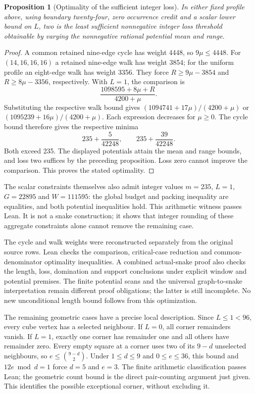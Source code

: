 \documentclass[11pt,a4paper]{article}
\newtheorem{proposition}[theorem]{Proposition}
\theoremstyle{definition}
\theoremstyle{remark}
\begin{document}
\begin{proposition}[Optimality of the sufficient integer loss]
In either fixed profile above, using boundary twenty-four, zero
occurrence credit and a scalar lower bound on $L$, two is the least
sufficient nonnegative integer loss threshold obtainable by varying
the nonnegative rational potential mean and range.
\end{proposition}
\begin{proof}
A common retained nine-edge cycle has weight 4448, so $9\mu\le4448$.
For $(14,16,16,16)$ a retained nine-edge walk has weight 3854;
for the uniform profile an eight-edge walk has weight 3356.
They force $R\ge9\mu-3854$ and $R\ge8\mu-3356$, respectively.
With $L=1$, the comparison is
\[
\frac{1098595+8\mu+R}{4200+\mu}.
\]
Substituting the respective walk bound gives
$(1094741+17\mu)/(4200+\mu)$ or
$(1095239+16\mu)/(4200+\mu)$. Each expression decreases for
$\mu\ge0$. The cycle bound therefore gives the respective minima
\[
235+\frac5{42248},\qquad 235+\frac{39}{42248}.
\]
Both exceed 235. The displayed potentials attain the mean and range
bounds, and loss two suffices by the preceding proposition. Loss zero
cannot improve the comparison. This proves the stated optimality.
\end{proof}

The scalar constraints themselves also admit integer values
$m=235$, $L=1$, $G=22895$ and $W=111595$: the global budget and packing
inequality are equalities, and both potential inequalities hold.
This arithmetic witness passes Lean. It is not a snake construction;
it shows that integer rounding of these aggregate constraints alone
cannot remove the remaining case.

The cycle and walk weights were reconstructed separately from the original
source rows. Lean checks the comparison, critical-case reduction and
common-denominator optimality inequalities. A combined actual-snake proof
also checks the length, loss, domination and support conclusions under
explicit window and potential premises. The finite potential scans
and the universal graph-to-snake interpretation remain different proof
obligations; the latter is still incomplete. No new unconditional length
bound follows from this optimization.

The remaining geometric cases have a precise local description.
Since $L\le1<96$, every cube vertex has a selected neighbour. If $L=0$,
all corner remainders vanish. If $L=1$, exactly one corner has remainder
one and all others have remainder zero. Every empty square at a corner
uses two of its $9-d$ unselected neighbours, so
$e\le\binom{9-d}{2}$. Under $1\le d\le9$ and $0\le e\le36$,
this bound and $12e\bmod d=1$ force $d=5$ and $e=3$.
The finite arithmetic classification passes Lean; the geometric
count bound is the direct pair-counting argument just given.
This identifies the possible exceptional corner, without excluding it.
\end{document}
